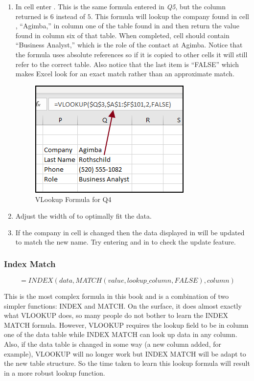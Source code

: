 \begin{enumerate}
	\item In cell  enter . This is the same formula entered in \textit{Q5}, but the column returned is $ 6 $ instead of $ 5 $. This formula will lookup the company found in cell , ``Agimba,'' in column one of the table found in  and then return the value found in column six of that table. When completed, cell  should contain ``Business Analyst,'' which is the role of the contact at Agimba.  Notice that the formula uses absolute references so if it is copied to other cells it will still refer to the correct table. Also notice that the last item is ``FALSE'' which makes Excel look for an exact match rather than an approximate match.
	
	\begin{figure}[H]
		\centering
		\includegraphics[width=\maxwidth{.75\linewidth}]{gfx/ch09_fig36}
		\caption{VLookup Formula for Q4}
		\label{09:fig36}
	\end{figure}
	
	\item Adjust the width of  to optimally fit the data.
	\item If the company in cell  is changed then the data displayed in  will be updated to match the new name. Try entering  and  in  to check the update feature.
\end{enumerate}

\subsubsection{Index Match}

\[ =INDEX(data,MATCH(value,lookup\_column,FALSE),column) \]

This is the most complex formula in this book and is a combination of two simpler functions: INDEX and MATCH. On the surface, it does almost exactly what VLOOKUP does, so many people do not bother to learn the INDEX MATCH formula. However, VLOOKUP requires the lookup field to be in column one of the data table while INDEX MATCH can look up data in any column. Also, if the data table is changed in some way (a new column added, for example), VLOOKUP will no longer work but INDEX MATCH will be adapt to the new table structure. So the time taken to learn this lookup formula will result in a more robust lookup function.

